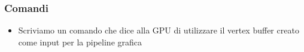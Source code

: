 \begin{frame}
\frametitle{Comandi}

\begin{itemize}
\item Scriviamo un comando che dice alla GPU di utilizzare il vertex buffer creato come input per la pipeline grafica
\end{itemize}

\end{frame}
